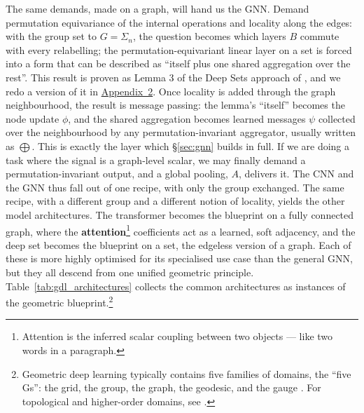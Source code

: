 \documentclass[graybox, envcountchap]{Template/svmult}
\begin{document}
The same demands, made on a graph, will hand us the GNN. Demand permutation equivariance of the internal operations and locality along the edges: with the group set to $G=\Sigma_n$, the question becomes which layers $B$ commute with every relabelling; the permutation-equivariant linear layer on a set is forced into a form that can be described as ``itself plus one shared aggregation over the rest''. This result is proven as Lemma 3 of the Deep Sets approach of \citet{Zaheer2017_deepsets}, and we redo a version of it in \hyperref[app:conv-proof]{Appendix~2}. Once locality is added through the graph neighbourhood, the result is message passing: the lemma's ``itself'' becomes the node update $\phi$, and the shared aggregation becomes learned messages $\psi$ collected over the neighbourhood by any permutation-invariant aggregator, usually written as $\bigoplus$. This is exactly the layer which \S\ref{sec:gnn} builds in full. If we are doing a task where the signal is a graph-level scalar, we may finally demand a permutation-invariant output, and a global pooling, $A$, delivers it. The CNN and the GNN thus fall out of one recipe, with only the group exchanged. The same recipe, with a different group and a different notion of locality, yields the other model architectures. The transformer becomes the blueprint on a fully connected graph, where the \textbf{attention}\footnote{Attention is the inferred scalar coupling between two objects --- like two words in a paragraph.} coefficients \citep{Vaswani2017_transformer_attention} act as a learned, soft adjacency, and the deep set becomes the blueprint on a set, the edgeless version of a graph. Each of these is more highly optimised for its specialised use case than the general GNN, but they all descend from one unified geometric principle. Table~\ref{tab:gdl_architectures} collects the common architectures as instances of the geometric blueprint.\footnote{Geometric deep learning typically contains five families of domains, the ``five Gs'': the grid, the group, the graph, the geodesic, and the gauge \citep{Bronstein2021_geometricDL_book}. For topological and higher-order domains, see \citet{Papillon2025_beyondeuclid_geometric}.}
\end{document}
